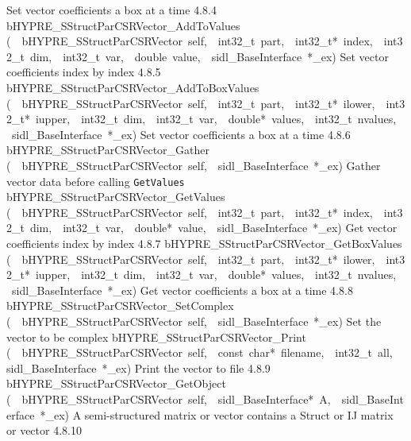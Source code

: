 \documentclass{article}
\begin{document}
\begin{cxxentry}
\begin{cxxentry}
\begin{cxxnames}
        {
Set vector coefficients a box at a time}
        {4.8.4}
        {bHYPRE\_SStructParCSRVector\_AddToValues}
        {(\ \ bHYPRE\_SStructParCSRVector\ self,\ \ int32\_t\ part,\ \ int32\_t*\ index,\ \ int32\_t\ dim,\ \ int32\_t\ var,\ \ double\ value,\ \ sidl\_BaseInterface\ *\_ex)}
        {
Set vector coefficients index by index}
        {4.8.5}
        {bHYPRE\_SStructParCSRVector\_AddToBoxValues}
        {(\ \ bHYPRE\_SStructParCSRVector\ self,\ \ int32\_t\ part,\ \ int32\_t*\ ilower,\ \ int32\_t*\ iupper,\ \ int32\_t\ dim,\ \ int32\_t\ var,\ \ double*\ values,\ \ int32\_t\ nvalues,\ \ sidl\_BaseInterface\ *\_ex)}
        {
Set vector coefficients a box at a time}
        {4.8.6}
        {bHYPRE\_SStructParCSRVector\_Gather}
        {(\ \ bHYPRE\_SStructParCSRVector\ self,\ \ sidl\_BaseInterface\ *\_ex)}
        {
Gather vector data before calling {\tt GetValues}}
        {}
\label{cxx.4.8.21}
        {bHYPRE\_SStructParCSRVector\_GetValues}
        {(\ \ bHYPRE\_SStructParCSRVector\ self,\ \ int32\_t\ part,\ \ int32\_t*\ index,\ \ int32\_t\ dim,\ \ int32\_t\ var,\ \ double*\ value,\ \ sidl\_BaseInterface\ *\_ex)}
        {
Get vector coefficients index by index}
        {4.8.7}
        {bHYPRE\_SStructParCSRVector\_GetBoxValues}
        {(\ \ bHYPRE\_SStructParCSRVector\ self,\ \ int32\_t\ part,\ \ int32\_t*\ ilower,\ \ int32\_t*\ iupper,\ \ int32\_t\ dim,\ \ int32\_t\ var,\ \ double*\ values,\ \ int32\_t\ nvalues,\ \ sidl\_BaseInterface\ *\_ex)}
        {
Get vector coefficients a box at a time}
        {4.8.8}
        {bHYPRE\_SStructParCSRVector\_SetComplex}
        {(\ \ bHYPRE\_SStructParCSRVector\ self,\ \ sidl\_BaseInterface\ *\_ex)}
        {
Set the vector to be complex}
        {}
\label{cxx.4.8.22}
        {bHYPRE\_SStructParCSRVector\_Print}
        {(\ \ bHYPRE\_SStructParCSRVector\ self,\ \ const\ char*\ filename,\ \ int32\_t\ all,\ \ sidl\_BaseInterface\ *\_ex)}
        {
Print the vector to file}
        {4.8.9}
        {bHYPRE\_SStructParCSRVector\_GetObject}
        {(\ \ bHYPRE\_SStructParCSRVector\ self,\ \ sidl\_BaseInterface*\ A,\ \ sidl\_BaseInterface\ *\_ex)}
        {
A semi-structured matrix or vector contains a Struct or IJ matrix
or vector}
        {4.8.10}

\end{cxxnames}
\end{cxxentry}
\end{cxxentry}
\end{document}
